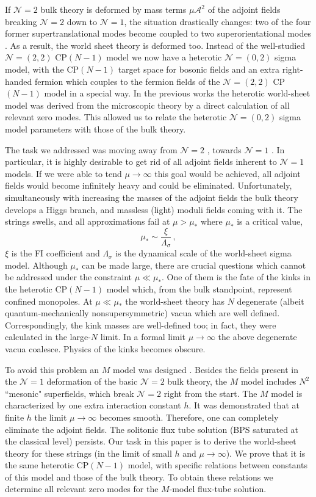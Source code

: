 \documentclass[12pt]{article}
\def\beq{\begin{equation}}
\def\eeq{\end{equation}}
\newcommand{\ntwo}{${\mathcal N}=2$ }
\newcommand{\ntwot}{${\mathcal N}= \left(2,2\right) $ }
\newcommand{\ntwoo}{${\mathcal N}= \left(0,2\right) $ }
\newcommand{\none}{${\mathcal N}=1$ }
\newcommand{\nonen}{${\mathcal N}=1$}
\begin{document}
If \ntwo bulk theory is deformed by mass terms $\mu{\mathcal A}^2$ of the adjoint fields
breaking \ntwo down to \nonen, the situation drastically changes:
two of the four former supertranslational modes
become coupled to two superorientational modes \cite{Edalati}.
As a result, the world sheet theory is deformed too.
Instead of the well-studied ${\mathcal N}=(2,2)$ CP$(N-1)$ model we now have
a heterotic \ntwoo 
sigma model, with the CP$(N-1)$ target space for bosonic fields and an extra 
right-handed fermion which couples to the fermion fields of the
\ntwot CP$(N-1)$ model in a special way. In the previous works \cite{SYhet,BSYhet}
the heterotic world-sheet model was derived from the microscopic theory by
a direct calculation of all relevant zero modes.
This allowed us 
to relate the  heterotic \ntwoo 
sigma model parameters with those of the bulk theory.

The task we addressed was moving away from \ntwo$\!\!$, towards \none$\!\!$.
In particular, it is highly desirable to get rid of all adjoint fields
inherent to \none models.  If we were able to tend $\mu\to\infty$ this goal would be achieved,
all adjoint fields would become infinitely heavy and could be eliminated. Unfortunately,
simultaneously with increasing the masses of the adjoint fields the bulk theory develops 
a Higgs branch, and massless (light) moduli fields coming with it. The strings swells,
and all approximations fail at $\mu >\mu_*$ where $\mu_*$ is a critical value,
\beq
\mu_* \sim \frac{\xi}{\Lambda_\sigma}\,,
\label{critmu}
\eeq
$\xi$ is the FI coefficient and $\Lambda_\sigma$ is the dynamical scale
of the world-sheet sigma model.
Although $\mu_*$ can be made large, there are crucial questions which cannot be addressed
under the constraint $\mu \ll \mu_*$. One of them is the fate of the kinks in the heterotic
CP$(N-1)$ model which, from the bulk standpoint, represent confined monopoles.
At $\mu \ll \mu_*$ the world-sheet theory has $N$ degenerate (albeit quantum-mechanically nonsupersymmetric) vacua
which are well defined. Correspondingly, the kink masses are well-defined too;
in fact, they were calculated \cite{SYhet2} in the large-$N$ limit. In a formal limit $\mu\to\infty$
the above degenerate vacua coalesce. Physics of the kinks becomes obscure.

To avoid this problem an $M$ model was designed \cite{GSYmmodel}. Besides the fields present in the
\none deformation of the basic \ntwo bulk theory, the $M$ model includes $N^2$
``mesonic" superfields, which break \ntwo right from the start. The $M$ model is characterized by one
extra interaction constant $h$. 
It was demonstrated \cite{GSYmmodel} that at finite $h$ the limit $\mu\to\infty$ becomes smooth.
Therefore, one can completely eliminate the adjoint fields.
The solitonic flux tube solution (BPS saturated at the classical level) persists.  
Our task in this paper is to derive the world-sheet theory for these strings (in the limit of
small $h$ and $\mu\to\infty$). We prove that it is the same heterotic
CP$(N-1)$ model, with specific relations between constants of this model and those of the bulk theory.
To obtain these relations we determine all relevant zero modes for the $M$-model flux-tube solution.
\end{document}
